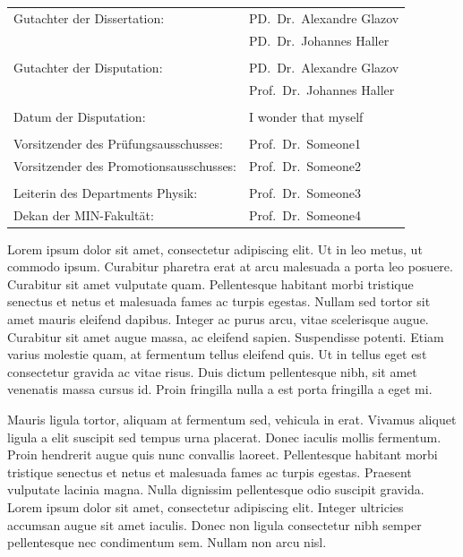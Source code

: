 \documentclass[oneside,11pt]{Classes/PhDthesisPSnPDF}
\begin{document}

\newpage
\thispagestyle{empty}
\vspace{12mm}
\begin{tabular}{ll}
Gutachter der Dissertation: & PD.~Dr.~Alexandre Glazov \\
                            & PD.~Dr.~Johannes Haller \\
    \\
Gutachter der Disputation:  & PD.~Dr.~Alexandre Glazov \\
							& Prof.~Dr.~Johannes Haller \\

    \\
Datum der Disputation: & I wonder that myself \\
\\
Vorsitzender des Pr\"ufungsausschusses: & Prof.~Dr.~Someone1 \\
Vorsitzender des Promotionsausschusses: & Prof.~Dr.~Someone2 \\
    \\
Leiterin des Departments Physik:        & Prof.~Dr.~Someone3 \\
Dekan der MIN-Fakult\"at:               & Prof.~Dr.~Someone4
\end{tabular}


\begin{abstracts}
 Lorem ipsum dolor sit amet, consectetur adipiscing elit. Ut in leo metus, ut commodo ipsum. Curabitur pharetra erat at arcu malesuada a porta leo posuere. Curabitur sit amet vulputate quam. Pellentesque habitant morbi tristique senectus et netus et malesuada fames ac turpis egestas. Nullam sed tortor sit amet mauris eleifend dapibus. Integer ac purus arcu, vitae scelerisque augue. Curabitur sit amet augue massa, ac eleifend sapien. Suspendisse potenti. Etiam varius molestie quam, at fermentum tellus eleifend quis. Ut in tellus eget est consectetur gravida ac vitae risus. Duis dictum pellentesque nibh, sit amet venenatis massa cursus id. Proin fringilla nulla a est porta fringilla a eget mi.

Mauris ligula tortor, aliquam at fermentum sed, vehicula in erat. Vivamus aliquet ligula a elit suscipit sed tempus urna placerat. Donec iaculis mollis fermentum. Proin hendrerit augue quis nunc convallis laoreet. Pellentesque habitant morbi tristique senectus et netus et malesuada fames ac turpis egestas. Praesent vulputate lacinia magna. Nulla dignissim pellentesque odio suscipit gravida. Lorem ipsum dolor sit amet, consectetur adipiscing elit. Integer ultricies accumsan augue sit amet iaculis. Donec non ligula consectetur nibh semper pellentesque nec condimentum sem. Nullam non arcu nisl.
\end{abstracts}
\end{document}

